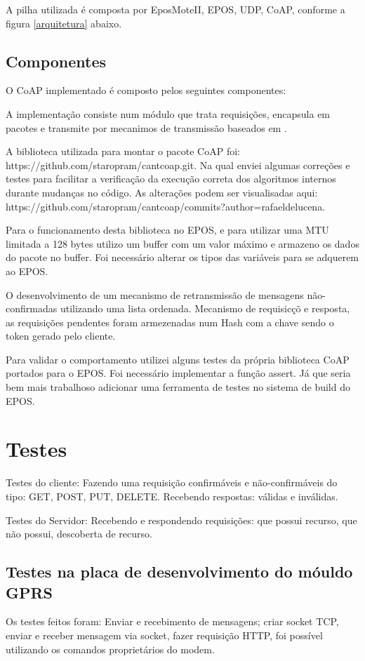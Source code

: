 A pilha utilizada \'e composta por EposMoteII, EPOS, UDP, CoAP, conforme a figura \ref{arquitetura} abaixo. 

\subsection{Componentes}
O CoAP implementado \'e composto pelos seguintes componentes:




A implementa\c{c}\~ao consiste num m\'odulo que trata requisi\c{c}\~oes, encapsula em pacotes e transmite por mecanimos de transmiss\~ao baseados em \cite{draft-ietf-core-coap-18}.

A biblioteca utilizada para montar o pacote CoAP foi:\\https://github.com/staropram/cantcoap.git. Na qual enviei algumas corre\c{c}\~oes e testes para facilitar a verifica\c{c}\~ao da execu\c{c}\~ao correta dos algoritmos internos durante mudan\c{c}as no c\'odigo. As altera\c{c}\~oes podem ser visualisadas aqui:\\https://github.com/staropram/cantcoap/commits?author=rafaeldelucena.

Para o funcionamento desta biblioteca no EPOS, e para utilizar uma MTU limitada a 128 bytes utilizo um buffer com um valor m\'aximo e armazeno os dados do pacote no buffer. Foi necess\'ario alterar os tipos das vari\'aveis para se adquerem ao EPOS.

O desenvolvimento de um mecanismo de retransmiss\~ao de mensagens n\~ao-confirmadas utilizando uma lista ordenada. Mecanismo de requisic\c{c}\~o e resposta, as requisi\c{c}\~oes pendentes foram armezenadas num Hash com a chave sendo o token gerado pelo cliente.

Para validar o comportamento utilizei alguns testes da pr\'opria biblioteca CoAP portados para o EPOS. Foi necess\'ario implementar a fun\c{c}\~ao assert. J\'a que seria bem mais trabalhoso adicionar uma ferramenta de testes no sistema de build do EPOS.

\section{Testes}
Testes do cliente:
Fazendo uma requisi\c{c}\~ao confirm\'aveis e n\~ao-confirm\'aveis do tipo: GET, POST, PUT, DELETE.
Recebendo respostas: válidas e inválidas.


Testes do Servidor:
Recebendo e respondendo requisi\c{c}\~oes: que possui recurso, que n\~ao possui, descoberta de recurso.

\subsection{Testes na placa de desenvolvimento do m\'ouldo GPRS}
Os testes feitos foram: Enviar e recebimento de mensagens; criar socket TCP, enviar e receber mensagem via socket, fazer requisi\c{c}\~ao HTTP, foi poss\'ivel utilizando os comandos propriet\'arios do modem.
